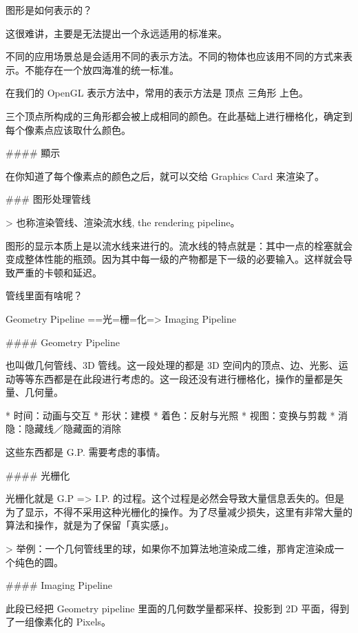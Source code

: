 \documentclass[
]{article}
\newenvironment{Shaded}{}{}
\newcommand{\DataTypeTok}[1]{\textcolor[rgb]{0.56,0.13,0.00}{#1}}
\newcommand{\FunctionTok}[1]{\textcolor[rgb]{0.02,0.16,0.49}{#1}}
\newcommand{\NormalTok}[1]{#1}
\newcommand{\StringTok}[1]{\textcolor[rgb]{0.25,0.44,0.63}{#1}}
\begin{document}
\begin{Shaded}
\begin{Highlighting}[]
\NormalTok{图形是如何表示的？}

\NormalTok{这很难讲，主要是无法提出一个永远适用的标准来。}

\NormalTok{不同的应用场景总是会适用不同的表示方法。不同的物体也应该用不同的方式来表示。不能存在一个放四海准的统一标准。}

\NormalTok{在我们的 OpenGL 表示方法中，常用的表示方法是 顶点 三角形 上色。}

\NormalTok{三个顶点所构成的三角形都会被上成相同的颜色。在此基础上进行栅格化，确定到每个像素点应该取什么颜色。}

\FunctionTok{#### 顯示}

\NormalTok{在你知道了每个像素点的颜色之后，就可以交给 Graphics Card 来渲染了。}

\FunctionTok{### 图形处理管线}

\NormalTok{>}\DataTypeTok{ 也称渲染管线、渲染流水线, the rendering pipeline。}

\NormalTok{图形的显示本质上是以流水线来进行的。流水线的特点就是：其中一点的栓塞就会变成整体性能的瓶颈。因为其中每一级的产物都是下一级的必要输入。这样就会导致严重的卡顿和延迟。}

\NormalTok{管线里面有啥呢？}

\NormalTok{Geometry Pipeline ==光=栅=化=> Imaging Pipeline}

\FunctionTok{#### Geometry Pipeline}

\NormalTok{也叫做几何管线、3D 管线。这一段处理的都是 3D 空间内的顶点、边、光影、运动等等东西都是在此段进行考虑的。这一段还没有进行栅格化，操作的量都是矢量、几何量。}

\NormalTok{* }\StringTok{时间：动画与交互}
\StringTok{* 形状：建模}
\StringTok{* 着色：反射与光照}
\StringTok{* 视图：变换与剪裁}
\StringTok{* 消隐：隐藏线／隐藏面的消除}

\NormalTok{这些东西都是 G.P. 需要考虑的事情。}

\FunctionTok{#### 光栅化}

\NormalTok{光栅化就是 G.P => I.P. 的过程。这个过程是必然会导致大量信息丢失的。但是为了显示，不得不采用这种光栅化的操作。为了尽量减少损失，这里有非常大量的算法和操作，就是为了保留「真实感」。}

\NormalTok{>}\DataTypeTok{ 举例：一个几何管线里的球，如果你不加算法地渲染成二维，那肯定渲染成一个纯色的圆。}

\FunctionTok{#### Imaging Pipeline}

\NormalTok{此段已经把 Geometry pipeline 里面的几何数学量都采样、投影到 2D 平面，得到了一组像素化的 Pixels。}


\end{Highlighting}
\end{Shaded}
\end{document}
